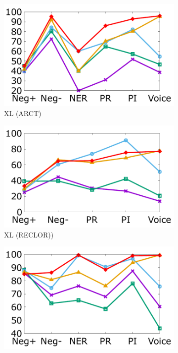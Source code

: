 \begin{figure}[th]
\begin{subfigure}[b]{0.162\textwidth}
\centering
\includegraphics[width=\columnwidth]{data/arct_xlnet.pdf}
\caption{XL (ARCT)}
\label{fig:arct_xlnet}
\end{subfigure}
\hfill
\begin{subfigure}[b]{0.162\textwidth}
\centering
\includegraphics[width=\columnwidth]{data/reclor_xlnet.pdf}
\caption{XL (RECLOR))}
\label{fig:reclor_xlnet}
\end{subfigure}
\hfill
\begin{subfigure}[b]{0.162\textwidth}
\centering
\includegraphics[width=\columnwidth]{data/roc_roberta.pdf}

\end{subfigure}
\end{figure}
